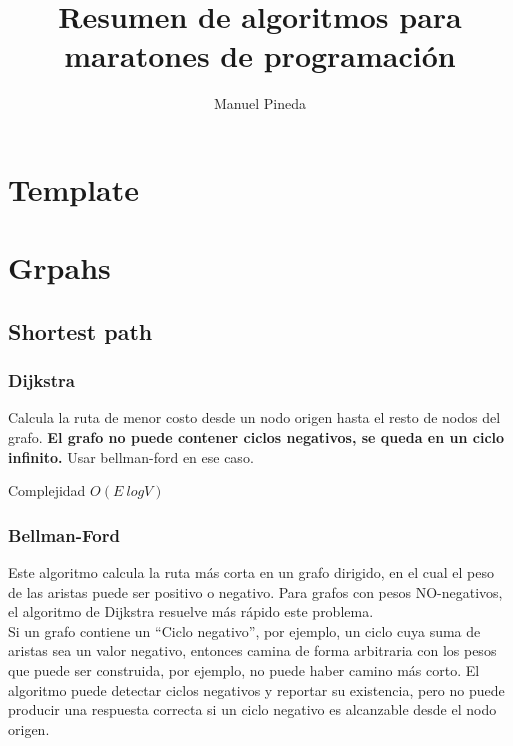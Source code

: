 \documentclass[10pt,letterpaper,twocolumn,twosided]{article}
\newcommand{\codigofuente}[1]{

\dotfill
}
\begin{document}
\title{Resumen de algoritmos para maratones de programación}
\author{Manuel Pineda}
\maketitle

\tableofcontents
{}

\section{Template}

\codigofuente{src/template.cpp}

\section{Grpahs}

\subsection{Shortest path}

\subsubsection{Dijkstra}
Calcula la ruta de menor costo desde un nodo origen hasta el resto de nodos del grafo. {\bf El grafo no puede contener ciclos negativos, se queda en un ciclo infinito.} Usar bellman-ford en ese caso.

Complejidad $O(E\ log V)$

\codigofuente{src/graphs/dijkstra.cpp}


\subsubsection{Bellman-Ford}
Este algoritmo calcula la ruta más corta en un grafo dirigido, en el cual el peso de las aristas puede ser positivo o negativo. Para grafos con pesos NO-negativos, el algoritmo de Dijkstra resuelve más
rápido este problema.\\


Si un grafo contiene un ``Ciclo negativo'', por ejemplo, un ciclo cuya suma de aristas sea un valor negativo, entonces camina de forma arbitraria con los pesos que puede ser construida, por ejemplo, no puede haber camino más corto.
El algoritmo puede detectar ciclos negativos y reportar su existencia, pero no puede producir una respuesta correcta si un ciclo negativo es alcanzable desde el nodo origen.\\
\end{document}
